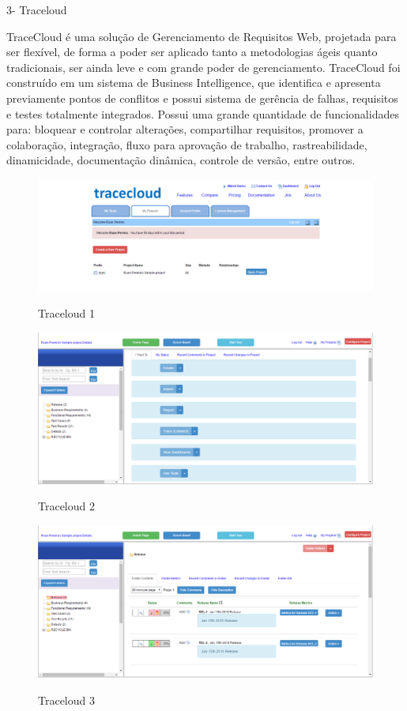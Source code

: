 3- Traceloud

TraceCloud é uma solução de Gerenciamento de Requisitos Web, projetada para ser flexível, de forma a poder ser aplicado tanto a metodologias ágeis quanto tradicionais, ser ainda leve e com grande poder de gerenciamento. TraceCloud foi construído em um sistema de Business Intelligence, que identifica e apresenta previamente pontos de conflitos e possui sistema de gerência de falhas, requisitos e testes totalmente integrados. Possui uma grande quantidade de funcionalidades para: bloquear e controlar alterações, compartilhar requisitos, promover a colaboração, integração, fluxo para aprovação de trabalho, rastreabilidade, dinamicidade, documentação dinâmica, controle de versão,  entre outros.

\FloatBarrier
\begin{figure}[!htpd]
		\centering
		\includegraphics[scale=0.5]{figuras/trace_1}
		\label{img:SAF}
		\caption{Traceloud 1}
\end{figure}
\FloatBarrier

\FloatBarrier
\begin{figure}[!htpd]
		\centering
		\includegraphics[scale=0.4]{figuras/trace_2}
		\label{img:SAF}
		\caption{Traceloud 2}
\end{figure}
\FloatBarrier

\FloatBarrier
\begin{figure}[!htpd]
		\centering
		\includegraphics[scale=0.5]{figuras/trace_3}
		\label{img:SAF}
		\caption{Traceloud 3}
\end{figure}
\FloatBarrier




